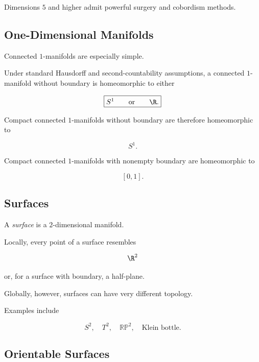 Dimensions \(5\) and higher admit powerful surgery and cobordism methods.

\subsection{One-Dimensional Manifolds}
\label{subsec:one-dimensional-manifolds}

Connected \(1\)-manifolds are especially simple.

Under standard Hausdorff and second-countability assumptions, a connected
\(1\)-manifold without boundary is homeomorphic to either

\[
\boxed{
S^1
\qquad\text{or}\qquad
\R.
}
\]

Compact connected \(1\)-manifolds without boundary are therefore
homeomorphic to

\[
\boxed{
S^1.
}
\]

Compact connected \(1\)-manifolds with nonempty boundary are homeomorphic to

\[
\boxed{
[0,1].
}
\]

\subsection{Surfaces}
\label{subsec:geometric-topology-surfaces}

A \emph{surface} is a \(2\)-dimensional manifold.

Locally, every point of a surface resembles

\[
\R^2
\]

or, for a surface with boundary, a half-plane.

Globally, however, surfaces can have very different topology.

Examples include

\[
\boxed{
S^2,
\quad
T^2,
\quad
\mathbb{RP}^2,
\quad
\text{Klein bottle}.
}
\]

\subsection{Orientable Surfaces}
\label{subsec:orientable-surfaces-geometric}

